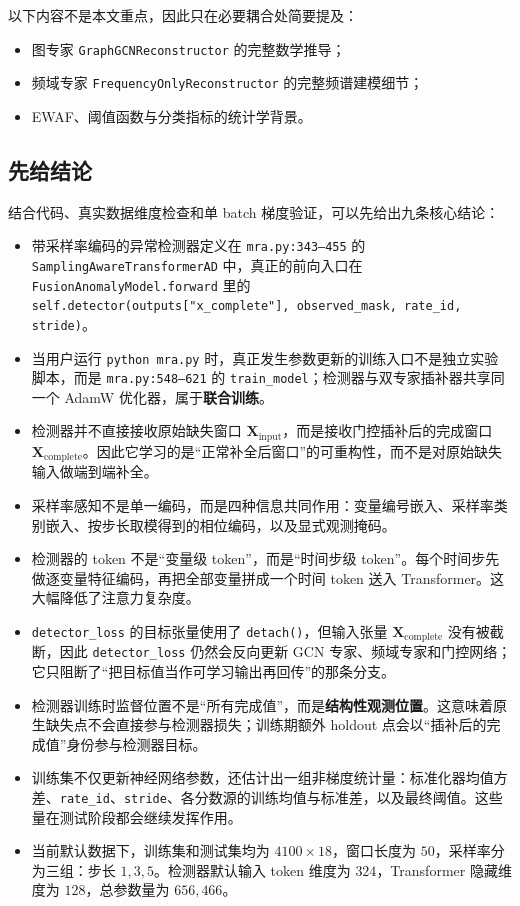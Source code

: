 \documentclass[UTF8]{ctexart}
\begin{document}
以下内容不是本文重点，因此只在必要耦合处简要提及：
\begin{itemize}
    \item 图专家 \texttt{GraphGCNReconstructor} 的完整数学推导；
    \item 频域专家 \texttt{FrequencyOnlyReconstructor} 的完整频谱建模细节；
    \item EWAF、阈值函数与分类指标的统计学背景。
\end{itemize}

\subsection{先给结论}

结合代码、真实数据维度检查和单 batch 梯度验证，可以先给出九条核心结论：
\begin{itemize}
    \item 带采样率编码的异常检测器定义在 \texttt{mra.py:343--455} 的 \texttt{SamplingAwareTransformerAD} 中，真正的前向入口在 \texttt{FusionAnomalyModel.forward} 里的\\
    \texttt{self.detector(outputs["x\_complete"], observed\_mask, rate\_id, stride)}。
    \item 当用户运行 \texttt{python mra.py} 时，真正发生参数更新的训练入口不是独立实验脚本，而是 \texttt{mra.py:548--621} 的 \texttt{train\_model}；检测器与双专家插补器共享同一个 AdamW 优化器，属于\textbf{联合训练}。
    \item 检测器并不直接接收原始缺失窗口 \(\bm{X}_{\text{input}}\)，而是接收门控插补后的完成窗口 \(\bm{X}_{\text{complete}}\)。因此它学习的是“正常补全后窗口”的可重构性，而不是对原始缺失输入做端到端补全。
    \item 采样率感知不是单一编码，而是四种信息共同作用：变量编号嵌入、采样率类别嵌入、按步长取模得到的相位编码，以及显式观测掩码。
    \item 检测器的 token 不是“变量级 token”，而是“时间步级 token”。每个时间步先做逐变量特征编码，再把全部变量拼成一个时间 token 送入 Transformer。这大幅降低了注意力复杂度。
    \item \texttt{detector\_loss} 的目标张量使用了 \texttt{detach()}，但输入张量 \(\bm{X}_{\text{complete}}\) 没有被截断，因此 \texttt{detector\_loss} 仍然会反向更新 GCN 专家、频域专家和门控网络；它只阻断了“把目标值当作可学习输出再回传”的那条分支。
    \item 检测器训练时监督位置不是“所有完成值”，而是\textbf{结构性观测位置}。这意味着原生缺失点不会直接参与检测器损失；训练期额外 holdout 点会以“插补后的完成值”身份参与检测器目标。
    \item 训练集不仅更新神经网络参数，还估计出一组非梯度统计量：标准化器均值方差、\texttt{rate\_id}、\texttt{stride}、各分数源的训练均值与标准差，以及最终阈值。这些量在测试阶段都会继续发挥作用。
    \item 当前默认数据下，训练集和测试集均为 \(4100 \times 18\)，窗口长度为 \(50\)，采样率分为三组：步长 \(1,3,5\)。检测器默认输入 token 维度为 \(324\)，Transformer 隐藏维度为 \(128\)，总参数量为 \(656{,}466\)。
\end{itemize}
\end{document}
